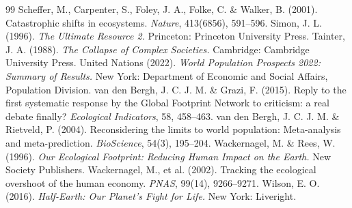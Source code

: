 \documentclass[11pt,a4paper]{article}
\begin{document}
\begin{thebibliography}{99}
 Scheffer, M., Carpenter, S., Foley, J. A., Folke, C. \& Walker, B. (2001). Catastrophic shifts in ecosystems. \emph{Nature}, 413(6856), 591--596.
 Simon, J. L. (1996). \emph{The Ultimate Resource 2.} Princeton: Princeton University Press.
 Tainter, J. A. (1988). \emph{The Collapse of Complex Societies.} Cambridge: Cambridge University Press.
 United Nations (2022). \emph{World Population Prospects 2022: Summary of Results.} New York: Department of Economic and Social Affairs, Population Division.
 van den Bergh, J. C. J. M. \& Grazi, F. (2015). Reply to the first systematic response by the Global Footprint Network to criticism: a real debate finally? \emph{Ecological Indicators}, 58, 458--463.
 van den Bergh, J. C. J. M. \& Rietveld, P. (2004). Reconsidering the limits to world population: Meta-analysis and meta-prediction. \emph{BioScience}, 54(3), 195--204.
 Wackernagel, M. \& Rees, W. (1996). \emph{Our Ecological Footprint: Reducing Human Impact on the Earth.} New Society Publishers.
 Wackernagel, M., et al. (2002). Tracking the ecological overshoot of the human economy. \emph{PNAS}, 99(14), 9266--9271.
 Wilson, E. O. (2016). \emph{Half-Earth: Our Planet's Fight for Life.} New York: Liveright.
\end{thebibliography}
\end{document}
